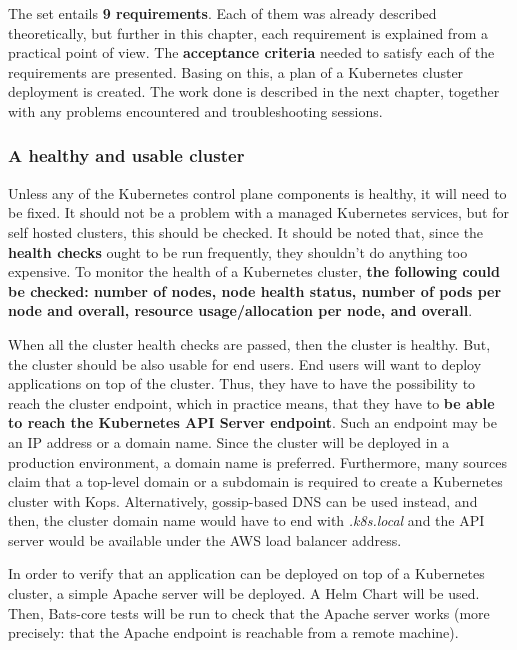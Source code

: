 The set entails \textbf{9 requirements}. Each of them was already described theoretically, but further in this chapter, each requirement is explained from a practical point of view. The \textbf{acceptance criteria} needed to satisfy each of the requirements are presented. Basing on this, a plan of a Kubernetes cluster deployment is created. The work done is described in the next chapter, together with any problems encountered and troubleshooting sessions.

\subsubsection{A healthy and usable cluster}
\label{A healthy cluster}

Unless any of the Kubernetes control plane components is healthy, it will need to be fixed. It should not be a problem with a managed Kubernetes services, but for self hosted clusters, this should be checked. It should be noted that, since the \textbf{health checks} ought to be run frequently, they shouldn't do anything too expensive. To monitor the health of a Kubernetes cluster, \textbf{the following could be checked: number of nodes, node health status, number of pods per node and overall, resource usage/allocation per node, and overall}\cite{book-cndwk}.

When all the cluster health checks are passed, then the cluster is healthy. But, the cluster should be also usable for end users. End users will want to deploy applications on top of the cluster. Thus, they have to have the possibility to reach the cluster endpoint, which in practice means, that they have to \textbf{be able to reach the Kubernetes API Server endpoint}. Such an endpoint may be an IP address or a domain name. Since the cluster will be deployed in a production environment, a domain name is preferred. Furthermore, many sources claim that a top-level domain or a subdomain is required to create a Kubernetes cluster with Kops. Alternatively, gossip-based DNS can be used instead, and then, the cluster domain name would have to end with \textit{.k8s.local} and the API server would be available under the AWS load balancer address\cite{kops-howto-aws}\cite{online-kops-aws}\cite{kops-howto-k8s}\cite{kops-gossip}.

In order to verify that an application can be deployed on top of a Kubernetes cluster, a simple Apache server will be deployed. A Helm Chart will be used\cite{helm-apache}. Then, Bats-core tests will be run to check that the Apache server works (more precisely: that the Apache endpoint is reachable from a remote machine).

